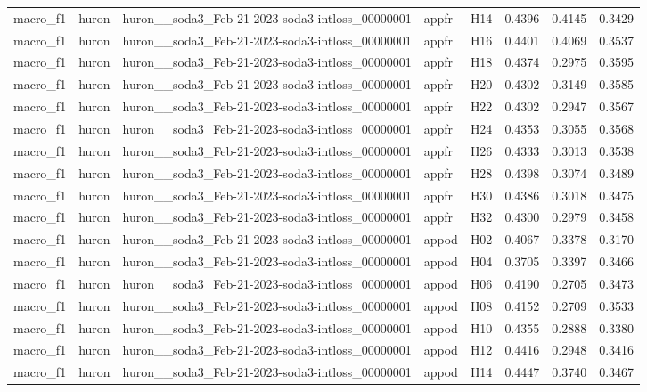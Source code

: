 \begin{table}[tbp]
\begin{tabular}{lllllrrr}
macro\_f1 & huron & huron\_\_soda3\_Feb-21-2023-soda3-intloss\_00000001 & appfr & H14 & 0.4396 & 0.4145 & 0.3429 \\
macro\_f1 & huron & huron\_\_soda3\_Feb-21-2023-soda3-intloss\_00000001 & appfr & H16 & 0.4401 & 0.4069 & 0.3537 \\
macro\_f1 & huron & huron\_\_soda3\_Feb-21-2023-soda3-intloss\_00000001 & appfr & H18 & 0.4374 & 0.2975 & 0.3595 \\
macro\_f1 & huron & huron\_\_soda3\_Feb-21-2023-soda3-intloss\_00000001 & appfr & H20 & 0.4302 & 0.3149 & 0.3585 \\
macro\_f1 & huron & huron\_\_soda3\_Feb-21-2023-soda3-intloss\_00000001 & appfr & H22 & 0.4302 & 0.2947 & 0.3567 \\
macro\_f1 & huron & huron\_\_soda3\_Feb-21-2023-soda3-intloss\_00000001 & appfr & H24 & 0.4353 & 0.3055 & 0.3568 \\
macro\_f1 & huron & huron\_\_soda3\_Feb-21-2023-soda3-intloss\_00000001 & appfr & H26 & 0.4333 & 0.3013 & 0.3538 \\
macro\_f1 & huron & huron\_\_soda3\_Feb-21-2023-soda3-intloss\_00000001 & appfr & H28 & 0.4398 & 0.3074 & 0.3489 \\
macro\_f1 & huron & huron\_\_soda3\_Feb-21-2023-soda3-intloss\_00000001 & appfr & H30 & 0.4386 & 0.3018 & 0.3475 \\
macro\_f1 & huron & huron\_\_soda3\_Feb-21-2023-soda3-intloss\_00000001 & appfr & H32 & 0.4300 & 0.2979 & 0.3458 \\
macro\_f1 & huron & huron\_\_soda3\_Feb-21-2023-soda3-intloss\_00000001 & appod & H02 & 0.4067 & 0.3378 & 0.3170 \\
macro\_f1 & huron & huron\_\_soda3\_Feb-21-2023-soda3-intloss\_00000001 & appod & H04 & 0.3705 & 0.3397 & 0.3466 \\
macro\_f1 & huron & huron\_\_soda3\_Feb-21-2023-soda3-intloss\_00000001 & appod & H06 & 0.4190 & 0.2705 & 0.3473 \\
macro\_f1 & huron & huron\_\_soda3\_Feb-21-2023-soda3-intloss\_00000001 & appod & H08 & 0.4152 & 0.2709 & 0.3533 \\
macro\_f1 & huron & huron\_\_soda3\_Feb-21-2023-soda3-intloss\_00000001 & appod & H10 & 0.4355 & 0.2888 & 0.3380 \\
macro\_f1 & huron & huron\_\_soda3\_Feb-21-2023-soda3-intloss\_00000001 & appod & H12 & 0.4416 & 0.2948 & 0.3416 \\
macro\_f1 & huron & huron\_\_soda3\_Feb-21-2023-soda3-intloss\_00000001 & appod & H14 & 0.4447 & 0.3740 & 0.3467 \\

\end{tabular}
\end{table}
